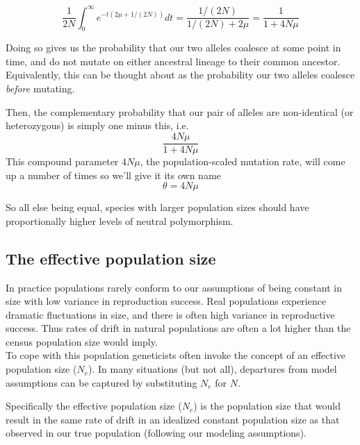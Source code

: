 \begin{equation}
\frac{1}{2N} \int_0^{\infty} e^{-t(2\mu+1/(2N))} dt =
\frac{1/(2N)}{1/(2N)+2\mu} = \frac{1}{1+4N\mu}
\end{equation}

Doing so gives us the probability that our two alleles coalesce at some point
in time, and do not mutate on either ancestral lineage to their common
ancestor. Equivalently, this can be thought about as the probability our two
alleles coalesce \emph{before} mutating.

Then, the complementary probability that our pair of alleles are non-identical
(or heterozygous) is simply one minus this, i.e.
\begin{equation}
\frac{4N\mu}{1+4N\mu} \label{eqn:hetero}
\end{equation}
This compound parameter $4N\mu$, the population-scaled mutation rate,
will come up a number of times so we'll give it its own name
\begin{equation}
\theta = 4N\mu
\end{equation}

So all else being equal, species with larger population sizes should
have proportionally higher levels of neutral polymorphism. 

\subsection{The effective population size}
In practice populations rarely conform to our assumptions of being
constant in size with low variance in reproduction success. Real
populations experience dramatic fluctuations in size, and there is
often high variance in reproductive success. Thus rates of drift in
natural populations are often a lot higher than the census population
size would imply.\\

To cope with this population geneticists often invoke the concept of
an effective population size ($N_e$). In many situations (but not all), departures from model assumptions can be captured by substituting $N_e$ for $N$.

Specifically the effective population size ($N_e$) is the population size that
would result in the same rate of drift in an idealized constant population size
as that observed in our true population (following our modeling assumptions).
\\


